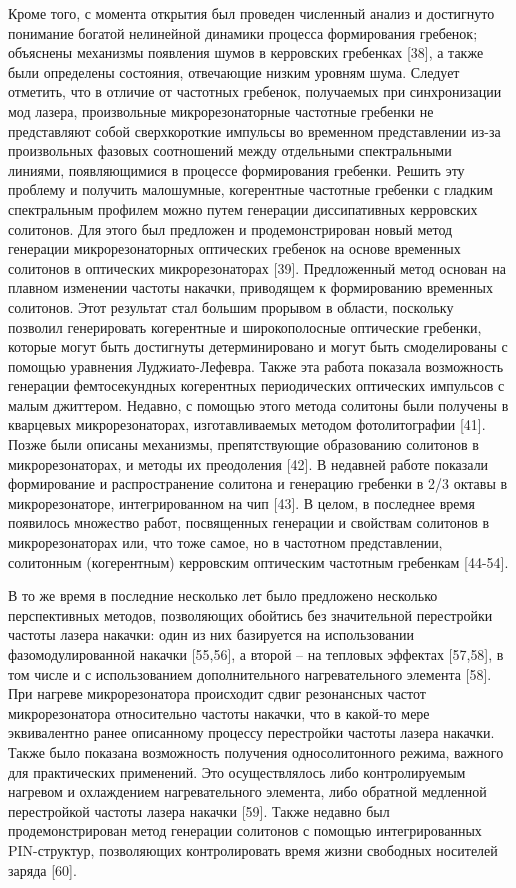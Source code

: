 Кроме того, с момента открытия был проведен численный анализ и достигнуто понимание богатой нелинейной динамики процесса формирования гребенок; объяснены механизмы появления шумов в керровских гребенках [38], а также были определены состояния, отвечающие низким уровням шума. Следует отметить, что в отличие от частотных гребенок, получаемых при синхронизации мод лазера, произвольные микрорезонаторные частотные гребенки не представляют собой сверхкороткие импульсы во временном представлении из-за произвольных фазовых соотношений между отдельными спектральными линиями, появляющимися в процессе формирования гребенки. Решить эту проблему и получить малошумные, когерентные частотные гребенки с гладким спектральным профилем можно путем генерации диссипативных керровских солитонов. Для этого был предложен и продемонстрирован новый метод генерации микрорезонаторных оптических гребенок на основе временных солитонов в оптических микрорезонаторах [39]. Предложенный метод основан на плавном изменении частоты накачки, приводящем к формированию временных солитонов. Этот результат стал большим прорывом в области, поскольку позволил генерировать когерентные и широкополосные оптические гребенки, которые могут быть достигнуты детерминировано и могут быть смоделированы с помощью уравнения Луджиато-Лефевра. Также эта работа показала возможность генерации фемтосекундных когерентных периодических оптических импульсов с малым джиттером. Недавно, с помощью этого метода солитоны были получены в кварцевых микрорезонаторах, изготавливаемых методом фотолитографии [41]. Позже были описаны механизмы, препятствующие образованию солитонов в микрорезонаторах, и методы их преодоления [42]. В недавней работе показали формирование и распространение солитона и генерацию гребенки в 2/3 октавы в микрорезонаторе, интегрированном на чип [43].  В целом, в последнее время появилось множество работ, посвященных генерации и свойствам солитонов в микрорезонаторах или, что тоже самое, но в частотном представлении, солитонным (когерентным) керровским оптическим частотным гребенкам [44-54].


В то же время в последние несколько лет было предложено несколько перспективных методов, позволяющих обойтись без значительной перестройки частоты лазера накачки: один из них базируется на использовании фазомодулированной накачки [55,56], а второй – на тепловых эффектах [57,58], в том числе и с использованием дополнительного нагревательного элемента [58]. При нагреве микрорезонатора происходит сдвиг резонансных частот микрорезонатора относительно частоты накачки, что в какой-то мере эквивалентно ранее описанному процессу перестройки частоты лазера накачки. Также было показана возможность получения односолитонного режима, важного для практических применений. Это осуществлялось либо контролируемым нагревом и охлаждением нагревательного элемента, либо обратной медленной перестройкой частоты лазера накачки [59]. Также недавно был продемонстрирован метод генерации солитонов с помощью интегрированных PIN-структур, позволяющих контролировать время жизни свободных носителей заряда [60].


